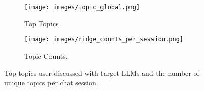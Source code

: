 \begin{figure}[t]
    \centering
    \vspace{-0.1cm}
     \begin{subfigure}[t]{0.23\textwidth}
    \texttt{[image: images/topic\_global.png]}
    \caption{Top Topics} 
    \label{fig:chat_topic_global}
    \end{subfigure}
    \begin{subfigure}[t]{0.23\textwidth}
    \texttt{[image: images/ridge\_counts\_per\_session.png]}
    \caption{Topic Counts.}
    \label{fig:topic_count}
    \end{subfigure}
    \vspace{-0.2cm}
    \caption{Top topics user discussed with target LLMs and the number of unique topics per chat session.}\label{fig:topic_stat}
     \vspace{-0.5cm}
\end{figure}